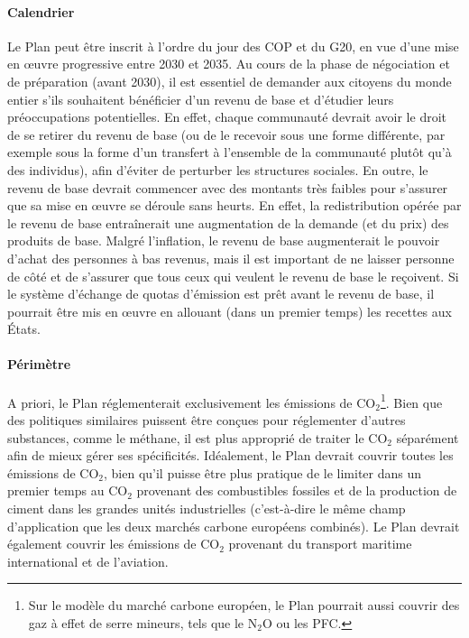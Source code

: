 \documentclass[a5paper,french]{memoir}
\begin{document}
\paragraph{Calendrier} 
Le Plan peut être inscrit à l'ordre du jour des COP et du G20, en vue d'une mise en œuvre progressive entre 2030 et 2035. Au cours de la phase de négociation et de préparation (avant 2030), il est essentiel de demander aux citoyens du monde entier s'ils souhaitent bénéficier d'un revenu de base et d'étudier leurs préoccupations potentielles. En effet, chaque communauté devrait avoir le droit de se retirer du revenu de base (ou de le recevoir sous une forme différente, par exemple sous la forme d'un transfert à l'ensemble de la communauté plutôt qu'à des individus), afin d'éviter de perturber les structures sociales. En outre, le revenu de base devrait commencer avec des montants très faibles pour s'assurer que sa mise en œuvre se déroule sans heurts. En effet, la redistribution opérée par le revenu de base entraînerait une augmentation de la demande (et du prix) des produits de base. Malgré l'inflation, le revenu de base augmenterait le pouvoir d'achat des personnes à bas revenus, mais il est important de ne laisser personne de côté et de s'assurer que tous ceux qui veulent le revenu de base le reçoivent. Si le système d'échange de quotas d'émission est prêt avant le revenu de base, il pourrait être mis en œuvre en allouant (dans un premier temps) les recettes aux États.

\paragraph{Périmètre} 
A priori, le Plan réglementerait exclusivement les émissions de CO$_\text{2}$\footnote{Sur le modèle du marché carbone européen, le Plan pourrait aussi couvrir des gaz à effet de serre mineurs, tels que le N$_\text{2}$O ou les PFC.}. Bien que des politiques similaires puissent être conçues pour réglementer d'autres substances, comme le méthane, il est plus approprié de traiter le CO$_\text{2}$ séparément afin de mieux gérer ses spécificités. Idéalement, le Plan devrait couvrir toutes les émissions de CO$_\text{2}$, bien qu'il puisse être plus pratique de le limiter dans un premier temps au CO$_\text{2}$ provenant des combustibles fossiles et de la production de ciment dans les grandes unités industrielles (c'est-à-dire le même champ d'application que les deux marchés carbone européens combinés). Le Plan devrait également couvrir les émissions de CO$_\text{2}$ provenant du transport maritime international et de l'aviation. 
\end{document}
